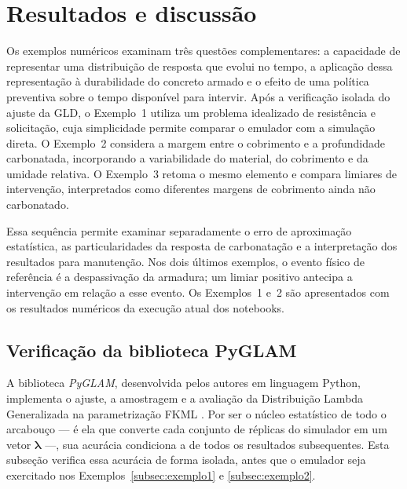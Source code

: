 \section{Resultados e discuss\~ao}\label{sec:resultados}


Os exemplos numéricos examinam três questões complementares: a capacidade de representar uma distribuição de resposta que evolui no tempo, a aplicação dessa representação à durabilidade do concreto armado e o efeito de uma política preventiva sobre o tempo disponível para intervir. Após a verificação isolada do ajuste da GLD, o Exemplo~1 utiliza um problema idealizado de resistência e solicitação, cuja simplicidade permite comparar o emulador com a simulação direta. O Exemplo~2 considera a margem entre o cobrimento e a profundidade carbonatada, incorporando a variabilidade do material, do cobrimento e da umidade relativa. O Exemplo~3 retoma o mesmo elemento e compara limiares de intervenção, interpretados como diferentes margens de cobrimento ainda não carbonatado.

Essa sequência permite examinar separadamente o erro de aproximação estatística, as particularidades da resposta de carbonatação e a interpretação dos resultados para manutenção. Nos dois últimos exemplos, o evento físico de referência é a despassivação da armadura; um limiar positivo antecipa a intervenção em relação a esse evento. Os Exemplos~1 e~2 são apresentados com os resultados numéricos da execução atual dos notebooks. 

\subsection{Verifica\c{c}\~ao da biblioteca PyGLAM}
\label{subsec:pyglam}

A biblioteca \textit{PyGLAM}, desenvolvida pelos autores em linguagem Python, implementa o ajuste, a amostragem e a avaliação da Distribuição Lambda Generalizada na parametrização FKML \parencite{Freimer1988}. Por ser o núcleo estatístico de todo o arcabouço --- é ela que converte cada conjunto de réplicas do simulador em um vetor $\boldsymbol{\lambda}$ ---, sua acurácia condiciona a de todos os resultados subsequentes. Esta subseção verifica essa acurácia de forma isolada, antes que o emulador seja exercitado nos Exemplos~\ref{subsec:exemplo1} e \ref{subsec:exemplo2}.

